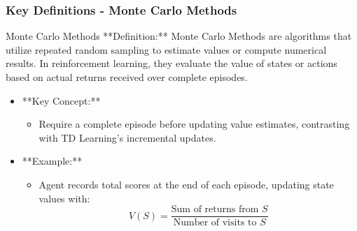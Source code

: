 \documentclass[aspectratio=169]{beamer}
\begin{document}
\begin{frame}[fragile]
    \frametitle{Key Definitions - Monte Carlo Methods}
    \begin{block}{Monte Carlo Methods}
        **Definition:** Monte Carlo Methods are algorithms that utilize repeated random sampling to estimate values or compute numerical results. In reinforcement learning, they evaluate the value of states or actions based on actual returns received over complete episodes.
    \end{block}

    \begin{itemize}
        \item **Key Concept:**
            \begin{itemize}
                \item Require a complete episode before updating value estimates, contrasting with TD Learning's incremental updates.
            \end{itemize}

        \item **Example:**
            \begin{itemize}
                \item Agent records total scores at the end of each episode, updating state values with:
                \[
                V(S) = \frac{\text{Sum of returns from } S}{\text{Number of visits to } S}
                \]
            \end{itemize}
    \end{itemize}
\end{frame}
\end{document}
